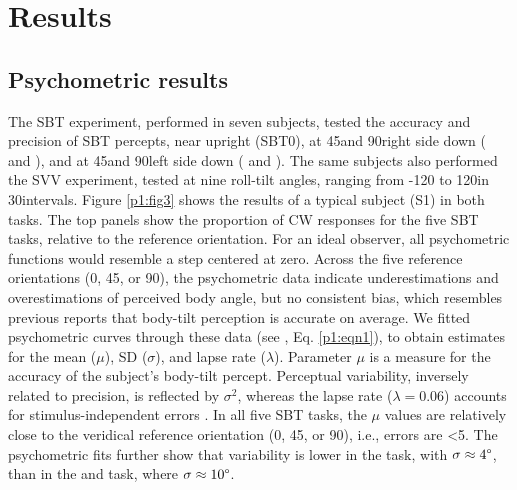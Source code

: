 \section{Results}

\subsection{Psychometric results}
 
The SBT experiment, performed in seven subjects, tested the accuracy and precision of SBT percepts, near upright (SBT0), at 45\mydegree and 90\mydegree right side down ( and ), and at 45\mydegree and 90\mydegree left side down ( and ). The same subjects also performed the SVV experiment, tested at nine roll-tilt angles, ranging from -120 to 120\mydegree in 30\mydegree intervals. Figure \ref{p1:fig3} shows the results of a typical subject (S1) in both tasks. The top panels show the proportion of CW responses for the five SBT tasks, relative to the reference orientation. For an ideal observer, all psychometric functions would resemble a step centered at zero. Across the five reference orientations (0\textdegree, {\textpm}45\textdegree, or {\textpm}90\textdegree), the psychometric data indicate underestimations and overestimations of perceived body angle, but no consistent bias, which resembles previous reports \cite{mittelstaedt1983, mast1996, jarchow1999, vanbeuzekom2001} that body-tilt perception is accurate on average. We fitted psychometric curves through these data (see , Eq. \ref{p1:eqn1}), to obtain estimates for the mean ($\mu$), SD ($\sigma$), and lapse rate ($\lambda$). Parameter $\mu$ is a measure for the accuracy of the subject's body-tilt percept. Perceptual variability, inversely related to precision, is reflected by $\sigma^2$, whereas the lapse rate ($\lambda = 0.06$) accounts for stimulus-independent errors \cite{wichmann2001}. In all five SBT tasks, the $\mu$ values are relatively close to the veridical reference orientation (0\textdegree, 45\textdegree, or 90\textdegree), i.e., errors are \textless5\textdegree. The psychometric fits further show that variability is lower in the  task, with $\sigma \approx 4\degree$, than in the  and  task, where $\sigma \approx 10\degree$. 

